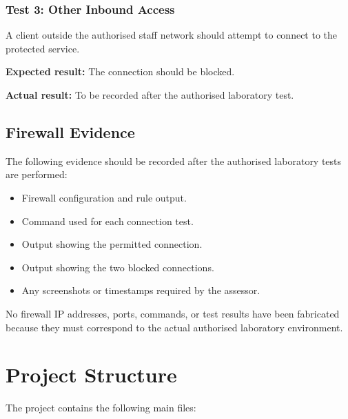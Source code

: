 \documentclass[12pt,a4paper]{article}
\begin{document}
\subsubsection{Test 3: Other Inbound Access}

A client outside the authorised staff network should attempt to connect to the protected service.

\textbf{Expected result:} The connection should be blocked.

\textbf{Actual result:} To be recorded after the authorised laboratory test.

\subsection{Firewall Evidence}

The following evidence should be recorded after the authorised laboratory tests are performed:

\begin{itemize}
    \item Firewall configuration and rule output.
    \item Command used for each connection test.
    \item Output showing the permitted connection.
    \item Output showing the two blocked connections.
    \item Any screenshots or timestamps required by the assessor.
\end{itemize}

No firewall IP addresses, ports, commands, or test results have been fabricated because they must correspond to the actual authorised laboratory environment.

\section{Project Structure}

The project contains the following main files:
\end{document}
